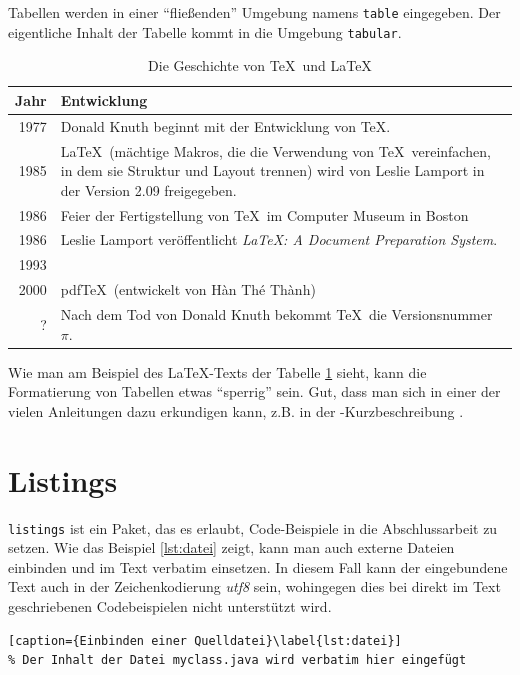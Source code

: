 Tabellen werden in einer \enquote{fließenden} Umgebung namens
\verb=table= eingegeben. Der eigentliche Inhalt der Tabelle kommt in die
Umgebung \verb=tabular=.

\begin{table}[!htb]
	\centering
	\caption{Die Geschichte von \TeX\ und \LaTeX}
	\begin{tabular}{ r p{13cm}}
		\toprule
		Jahr & Entwicklung\\
		\midrule
		1977 & Donald Knuth beginnt mit der Entwicklung von \TeX.\\
		1985 & \LaTeX\ (mächtige Makros, die die Verwendung von \TeX\
			vereinfachen, in dem sie Struktur und Layout trennen) wird von
			Leslie Lamport in der Version 2.09 freigegeben.\\
		1986 & Feier der Fertigstellung von \TeX\ im Computer Museum in
		Boston\\
		1986 & Leslie Lamport veröffentlicht \emph{\LaTeX: A Document
			Preparation System}.\\
		1993 & \LaTeXe\\
		2000 & pdf\TeX\ (entwickelt von Hàn Thé Thành)\\
			?  & Nach dem Tod von Donald Knuth bekommt \TeX\ die Versionsnummer
			$\pi$.\\
		\bottomrule
	\end{tabular}
	\label{tbl:geschichte}
\end{table}

Wie man am Beispiel des \LaTeX-Texts der Tabelle  \ref{tbl:geschichte}
sieht, kann die Formatierung von Tabellen etwas \enquote{sperrig} sein.
Gut, dass man sich in einer der vielen Anleitungen dazu erkundigen kann,
z.B. in der \LaTeXe-Kurzbeschreibung \cite[S.23]{lkurz15}.

\section{Listings}

\verb=listings= ist ein Paket, das es erlaubt, Code-Beispiele in die
Abschlussarbeit zu setzen. Wie das Beispiel \ref{lst:datei} zeigt, kann
man auch externe Dateien einbinden und im Text verbatim einsetzen. In
diesem Fall kann der eingebundene Text auch in der Zeichenkodierung
\emph{utf8} sein, wohingegen dies bei direkt im Text geschriebenen
Codebeispielen nicht unterstützt wird.

\begin{lstlisting}[caption={Einbinden einer Quelldatei}\label{lst:datei}]
% Der Inhalt der Datei myclass.java wird verbatim hier eingefügt

\end{lstlisting}

